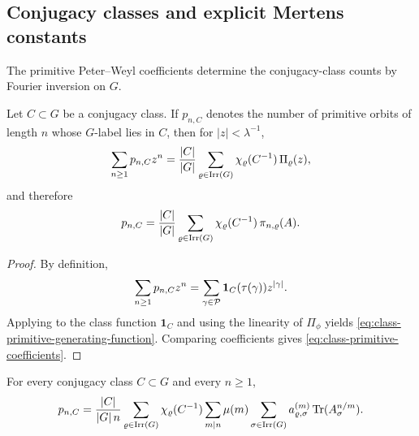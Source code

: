 \subsection{Conjugacy classes and explicit Mertens constants}

The primitive Peter--Weyl coefficients determine the conjugacy-class
counts by Fourier inversion on \(G\).

\begin{theorem}
  \label{thm:class-primitive-decomposition}
  Let \(C\subset G\) be a conjugacy class. If \(p_{n,C}\) denotes the
  number of primitive orbits of length \(n\) whose \(G\)-label lies in
  \(C\), then for \(|z|<\lambda^{-1}\),
  \begin{equation}\label{eq:class-primitive-generating-function}
    \sum_{n\ge 1}p_{n,C}z^n
    =
    \frac{|C|}{|G|}
      \sum_{\varrho\in\operatorname{Irr}(G)}
        \chi_\varrho(C^{-1})\,\Pi_\varrho(z),
  \end{equation}
  and therefore
  \begin{equation}\label{eq:class-primitive-coefficients}
    p_{n,C}
    =
    \frac{|C|}{|G|}
      \sum_{\varrho\in\operatorname{Irr}(G)}
        \chi_\varrho(C^{-1})\,\pi_{n,\varrho}(A).
  \end{equation}
\end{theorem}

\begin{proof}
  By definition,
  \[
    \sum_{n\ge 1}p_{n,C}z^n
    =
    \sum_{\gamma\in\mathcal P}\mathbf 1_C(\tau(\gamma))z^{|\gamma|}.
  \]
  Applying  to the class function
  \(\mathbf 1_C\) and using the linearity of \(\Pi_\phi\) yields
  \eqref{eq:class-primitive-generating-function}. Comparing coefficients
  gives \eqref{eq:class-primitive-coefficients}.
\end{proof}

\begin{corollary}
  \label{cor:class-artin-mobius-trace}
  For every conjugacy class \(C\subset G\) and every \(n\ge 1\),
  \begin{equation}\label{eq:class-artin-mobius-trace}
    p_{n,C}
    =
    \frac{|C|}{|G|\,n}
      \sum_{\varrho\in\operatorname{Irr}(G)}
        \chi_\varrho(C^{-1})
        \sum_{m\mid n}\mu(m)
          \sum_{\sigma\in\operatorname{Irr}(G)}
            a_{\varrho,\sigma}^{(m)}
            \operatorname{Tr}(A_\sigma^{n/m}).
  \end{equation}
\end{corollary}


